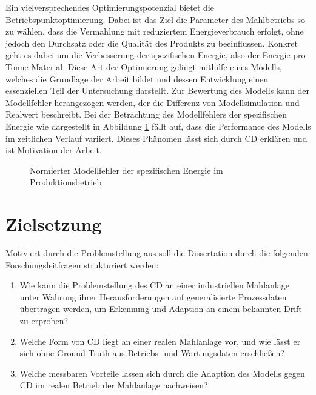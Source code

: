 %
Ein vielversprechendes Optimierungspotenzial bietet die Betriebspunktoptimierung. Dabei ist das Ziel die Parameter des Mahlbetriebs so zu wählen, dass die Vermahlung mit reduziertem Energieverbrauch erfolgt, ohne jedoch den Durchsatz oder die Qualität des Produkts zu beeinflussen. Konkret geht es dabei um die Verbesserung der spezifischen Energie, also der Energie pro Tonne Material. Diese Art der Optimierung gelingt mithilfe eines Modells, welches die Grundlage der Arbeit bildet und dessen Entwicklung einen essenziellen Teil der Untersuchung darstellt. 
Zur Bewertung des Modells kann der Modellfehler herangezogen werden, der die Differenz von Modellsimulation und Realwert beschreibt. Bei der Betrachtung des Modellfehlers der spezifischen Energie wie dargestellt in Abbildung \ref{fig:modellfehler} fällt auf, dass die Performance des Modells im zeitlichen Verlauf variiert. Dieses Phänomen lässt sich durch \ac{CD} erklären und ist Motivation der Arbeit.
%
\begin{figure}[hbt!]
    \centering
    
    \caption{Normierter Modellfehler der spezifischen Energie im Produktionsbetrieb}
    \label{fig:modellfehler}
\end{figure}
%
\section{Zielsetzung} \label{sec:zielsetzung}

Motiviert durch die Problemstellung aus soll die Dissertation durch die folgenden Forschungsleitfragen strukturiert werden:

\begin{enumerate}
    \item Wie kann die Problemstellung des \ac{CD} an einer industriellen Mahlanlage unter Wahrung ihrer Herausforderungen auf generalisierte Prozessdaten übertragen werden, um Erkennung und Adaption an einem bekannten Drift zu erproben?
    \item Welche Form von \ac{CD} liegt an einer realen Mahlanlage vor, und wie lässt er sich ohne Ground Truth aus Betriebs- und Wartungsdaten erschließen?
    \item Welche messbaren Vorteile lassen sich durch die Adaption des Modells gegen \ac{CD} im realen Betrieb der Mahlanlage nachweisen?
\end{enumerate}
